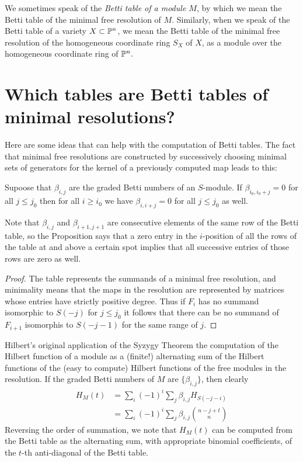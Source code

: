 \noindent We sometimes speak of the \emph{Betti table of a module $M$}, by which we mean the Betti table of the minimal free resolution
of $M$. Similarly, when we speak of the Betti table of a variety $X\subset {\mathbb P}^{n}$, we mean the Betti table of the minimal free resolution
of the homogeneous coordinate ring $S_{X}$ of $X$, as a module over the homogeneous coordinate ring of ${\mathbb P}^{n}.$ 


\section{Which tables are Betti tables of minimal resolutions?}\label{which tables}
Here are some ideas that can help with the computation of Betti tables. The fact that minimal free resolutions are
constructed by successively choosing minimal sets of generators for the kernel of a previously 
computed map leads to this:

\begin{proposition}\label{zero implications}
Supoose that $\beta_{i,j}$ are the graded Betti numbers of an $S$-module. If $\beta_{i_{0},i_{0}+j} = 0$ for all $j\leq j_{0}$ then for all $i\geq i_{0}$ we have
$\beta_{i, i+j} = 0$ for all $j\leq j_{0}$ as well.
\end{proposition}

Note that $\beta_{i,j}$ and $\beta_{i+1,j+1}$ are consecutive elements of the same row of the Betti
table, so the Proposition says that a zero entry in the $i$-position of all the rows of the table at and above
a certain spot implies that all successive entries
of those rows are zero as well.

\begin{proof}
The table represents the summands of a minimal free resolution, and minimality means that the maps in the resolution are represented by matrices whose entries have strictly positive degree. Thus if
$F_{i}$ has no summand isomorphic to $S(-j)$ for $j\leq j_{0}$ it follows that there can be no summand
of $F_{i+1}$ isomorphis to $S(-j-1)$ for the same range of $j$.
\end{proof}

 Hilbert's original application of the Syzygy Theorem the computation of the Hilbert function of a module as a (finite!) alternating sum of the Hilbert functions of the (easy to compute) Hilbert functions of the free modules in the resolution. If the graded Betti numbers of $M$ are $\{\beta_{i,j}\}$, then clearly
\begin{align*}
 H_{M}(t) &= \sum_{i}(-1)^{i}\sum_{j}\beta_{i,j}H_{S(-j-i)}\\
 &= \sum_{i}(-1)^{i}\sum_{j}\beta_{i,j}{n-j+t\choose n}
\end{align*}
Reversing the order of summation, we note that $H_{M}(t)$ can be computed from the Betti table as the 
alternating sum, with appropriate binomial coefficients, of the $t$-th anti-diagonal of the Betti table. 

